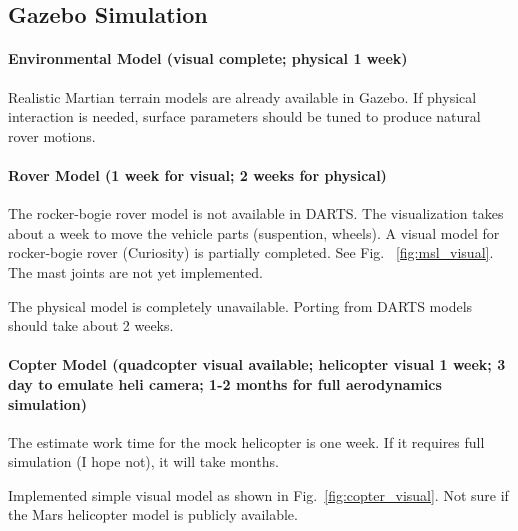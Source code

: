 \documentclass[conference]{IEEEtran}
\newcommand{\kyon}[1]{{\color{cyan} #1}}
\begin{document}
\subsection{Gazebo Simulation}

\paragraph{Environmental Model (visual complete; physical 1 week)}
Realistic Martian terrain models are already available in Gazebo. If physical interaction is needed, surface parameters should be tuned to produce natural rover motions. 

\paragraph{Rover Model (1 week for visual; 2 weeks for physical)}
The rocker-bogie rover model is not available in DARTS. The visualization takes about a week to move the vehicle parts (suspention, wheels).
\kyon{A visual model for rocker-bogie rover (Curiosity) is partially completed. See Fig.~ \ref{fig:msl_visual}. The mast joints are not yet implemented.}

The physical model is completely unavailable. Porting from DARTS models should take about 2 weeks.



\paragraph{Copter Model (quadcopter visual available; helicopter visual 1 week; 3 day to emulate heli camera; 1-2 months for full aerodynamics simulation)}
The estimate work time for the mock helicopter is one week. If it requires full simulation (I hope not), it will take months. 

\kyon{Implemented simple visual model as shown in Fig.~\ref{fig:copter_visual}. Not sure if the Mars helicopter model is publicly available.}
\end{document}
